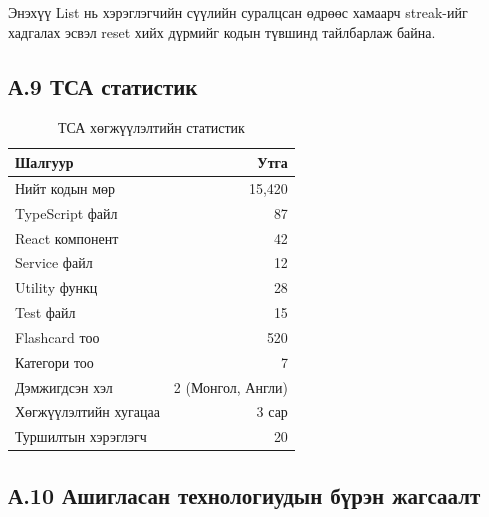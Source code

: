Энэхүү List нь хэрэглэгчийн сүүлийн суралцсан өдрөөс хамаарч streak-ийг хадгалах эсвэл reset хийх дүрмийг кодын түвшинд тайлбарлаж байна.

\subsection*{А.9 ТСА статистик}

\begin{table}[H]
\centering
\caption{ТСА хөгжүүлэлтийн статистик}
\begin{tabular}{|l|r|}
\hline
\textbf{Шалгуур} & \textbf{Утга} \\
\hline
Нийт кодын мөр & 15,420 \\
\hline
TypeScript файл & 87 \\
\hline
React компонент & 42 \\
\hline
Service файл & 12 \\
\hline
Utility функц & 28 \\
\hline
Test файл & 15 \\
\hline
Flashcard тоо & 520 \\
\hline
Категори тоо & 7 \\
\hline
Дэмжигдсэн хэл & 2 (Монгол, Англи) \\
\hline
Хөгжүүлэлтийн хугацаа & 3 сар \\
\hline
Туршилтын хэрэглэгч & 20 \\
\hline
\end{tabular}
\end{table}

\subsection*{А.10 Ашигласан технологиудын бүрэн жагсаалт}

